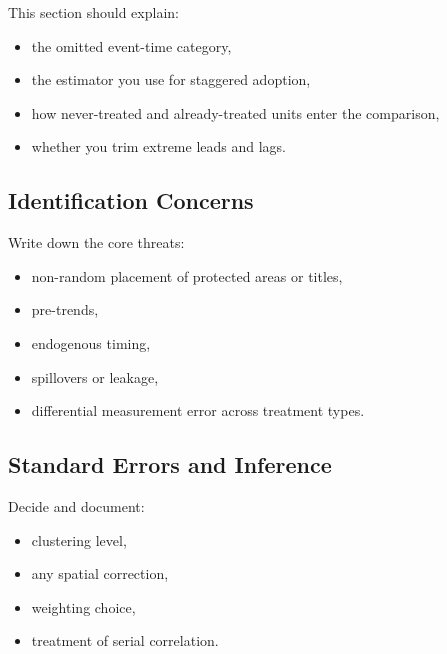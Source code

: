This section should explain:

\begin{itemize}
    \item the omitted event-time category,
    \item the estimator you use for staggered adoption,
    \item how never-treated and already-treated units enter the comparison,
    \item whether you trim extreme leads and lags.
\end{itemize}

\subsection{Identification Concerns}

Write down the core threats:

\begin{itemize}
    \item non-random placement of protected areas or titles,
    \item pre-trends,
    \item endogenous timing,
    \item spillovers or leakage,
    \item differential measurement error across treatment types.
\end{itemize}

\subsection{Standard Errors and Inference}

Decide and document:

\begin{itemize}
    \item clustering level,
    \item any spatial correction,
    \item weighting choice,
    \item treatment of serial correlation.
\end{itemize}
